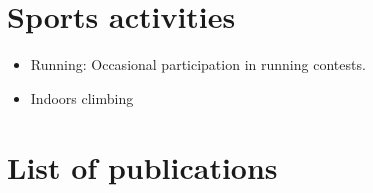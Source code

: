 \documentclass[11pt,a4paper,sans]{moderncv} %
\begin{document}


\section{Sports activities}

\renewcommand{\listitemsymbol}{-~} %

\begin{itemize}
\item Running: Occasional participation in running contests.
\item Indoors climbing
\end{itemize}

\section{List of publications}

\renewcommand{\listitemsymbol}{-~} %
\end{document}

